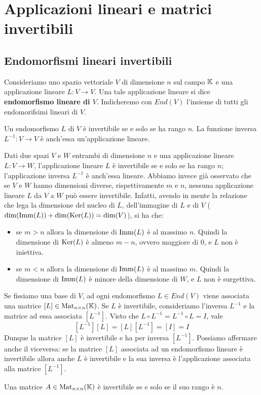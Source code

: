 \chapter{Applicazioni lineari e matrici invertibili}
\section{Endomorfismi lineari invertibili}

\begin{definition}
	Consideriamo uno spazio vettoriale $V$ di dimensione $n$ sul campo $\mathbb{K}$ e
	una applicazione lineare $L : V \to V$. Una tale applicazione lineare si dice
	\textbf{endomorfismo lineare di $V$}. Indicheremo con $End(V)$ l'insieme di tutti gli
	endomorifsimi lineari di $V$.
\end{definition}

\begin{proposition}
	Un endomorfismo $L$ di $V$ è invertibile se e solo se ha rango $n$. La
	funzione inversa $L^{-1} : V \to V$ è anch'essa un'applicazione lineare.
\end{proposition}

\begin{observation}
	Dati due spazi $V$ e $W$ entrambi di dimensione $n$ e una applicazione lineare
	$L : V \to W$, l'applicazione lineare $L$ è invertibile se e solo se ha rango
	$n$; l'applicazione inversa $L^{-1}$ è anch'essa lineare.
	Abbiamo invece già osservato che se $V$ e $W$ hanno dimensioni diverse,
	rispettivamente $m$ e $n$, nessuna applicazione lineare $L$ da $V$ a $W$ può
	essere invertibile. Infatti, avendo in mente la relazione che lega la dimensione
	del nucleo di $L$, dell'immagine di $L$ e di $V$
	($\dim(\operatorname{Imm}(L)) + \dim(\operatorname{Ker}(L)) = \dim(V)$), si ha che:
	\begin{itemize}
		\item se $m > n$ allora la dimensione di $\operatorname{Imm}(L)$ è al massimo $n$.
		      Quindi la dimensione di $\operatorname{Ker}(L)$ è almeno $m - n$, ovvero
		      maggiore di 0, e $L$ non è iniettiva.
		\item se $m < n$ allora la dimensione di $\operatorname{Imm}(L)$ è al massimo $m$.
		      Quindi la dimensione di $\operatorname{Imm}(L)$ è minore della dimensione di
		      $W$, e $L$ non è surgettiva.
	\end{itemize}
\end{observation}

Se fissiamo una base di $V$, ad ogni endomorfismo $L \in End(V)$ viene associata
una matrice $[L] \in \operatorname{Mat}_{n \times n}(\mathbb{K})$. Se $L$ è invertibile,
consideriamo l'inversa $L^{-1}$ e la matrice ad essa associata $[L^{-1}]$.
Visto che $L \circ L^{-1} = L^{-1} \circ L = I$, vale
\[ [L^{-1}][L] = [L][L^{-1}] = [I] = I \]
Dunque la matrice $[L]$ è invertibile e ha per inversa $[L^{-1}]$.
Possiamo affermare anche il viceversa: se la matrice $[L]$ associata ad un
endomorfismo lineare è invertibile allora anche $L$ è invertibile e la sua
inversa è l'applicazione associata alla matrice $[L^{-1}]$.

\begin{corollary}
	Una matrice $A \in \operatorname{Mat}_{n \times n}(\mathbb{K})$ è invertibile se e solo se
	il suo rango è $n$.
\end{corollary}
